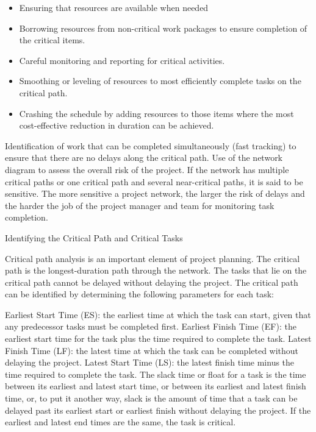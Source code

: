 \begin{itemize}
\item Ensuring that resources are available when needed 
\item Borrowing resources from non-critical work packages to ensure completion of the critical items.
\item Careful monitoring and reporting for critical activities.
\item Smoothing or leveling of resources to most efficiently complete tasks on the critical path.
\item Crashing the schedule by adding resources to those items where the most cost-effective reduction in duration can be achieved. 
\end{itemize}
Identification of work that can be completed simultaneously (fast tracking) to ensure that there are no delays along the critical path. 
Use of the network diagram to assess the overall risk of the project. If the network has multiple critical paths or one critical path and several near-critical paths, it is said to be sensitive. The more sensitive a project network, the larger the risk of delays and the harder the job of the project manager and team for monitoring task completion. 

\newpage


Identifying the Critical Path and Critical Tasks

Critical path analysis is an important element of project planning. The critical path is the longest-duration path through the network. The tasks that lie on the critical path cannot be delayed without delaying the project. The critical path can be identified by determining the following parameters for each task:

Earliest Start Time (ES): the earliest time at which the task can start, given that any predecessor tasks must be completed first.
Earliest Finish Time (EF): the earliest start time for the task plus the time required to complete the task.
Latest Finish Time (LF): the latest time at which the task can be completed without delaying the project.
Latest Start Time (LS): the latest finish time minus the time required to complete the task.
The slack time or float for a task is the time between its earliest and latest start time, or between its earliest and latest finish time, or, to put it another way, slack is the amount of time that a task can be delayed past its earliest start or earliest finish without delaying the project. If the earliest and latest end times are the same, the task is critical.

